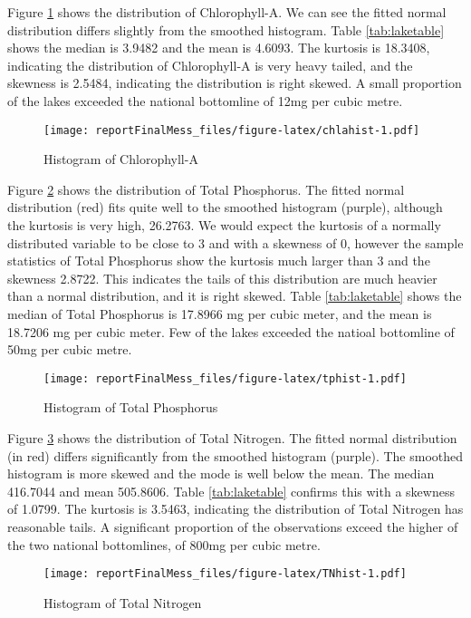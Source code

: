 \documentclass[
]{article}
\begin{document}
Figure \ref{fig:chlahist} shows the distribution of Chlorophyll-A. We can see the fitted normal distribution differs slightly from the smoothed histogram. Table \ref{tab:laketable} shows the median is 3.9482 and the mean is 4.6093. The kurtosis is 18.3408, indicating the distribution of Chlorophyll-A is very heavy tailed, and the skewness is 2.5484, indicating the distribution is right skewed. A small proportion of the lakes exceeded the national bottomline of 12mg per cubic metre.

\begin{figure}
\centering
\texttt{[image: reportFinalMess\_files/figure-latex/chlahist-1.pdf]}
\caption{\label{fig:chlahist}Histogram of Chlorophyll-A}
\end{figure}

Figure \ref{fig:tphist} shows the distribution of Total Phosphorus. The fitted normal distribution (red) fits quite well to the smoothed histogram (purple), although the kurtosis is very high, 26.2763. We would expect the kurtosis of a normally distributed variable to be close to 3 and with a skewness of 0, however the sample statistics of Total Phosphorus show the kurtosis much larger than 3 and the skewness 2.8722. This indicates the tails of this distribution are much heavier than a normal distribution, and it is right skewed. Table \ref{tab:laketable} shows the median of Total Phosphorus is 17.8966 mg per cubic meter, and the mean is 18.7206 mg per cubic meter. Few of the lakes exceeded the natioal bottomline of 50mg per cubic metre.

\begin{figure}
\centering
\texttt{[image: reportFinalMess\_files/figure-latex/tphist-1.pdf]}
\caption{\label{fig:tphist}Histogram of Total Phosphorus}
\end{figure}

Figure \ref{fig:TNhist} shows the distribution of Total Nitrogen. The fitted normal distribution (in red) differs significantly from the smoothed histogram (purple). The smoothed histogram is more skewed and the mode is well below the mean. The median 416.7044 and mean 505.8606. Table \ref{tab:laketable} confirms this with a skewness of 1.0799. The kurtosis is 3.5463, indicating the distribution of Total Nitrogen has reasonable tails. A significant proportion of the observations exceed the higher of the two national bottomlines, of 800mg per cubic metre.

\begin{figure}
\centering
\texttt{[image: reportFinalMess\_files/figure-latex/TNhist-1.pdf]}
\caption{\label{fig:TNhist}Histogram of Total Nitrogen}
\end{figure}
\end{document}
